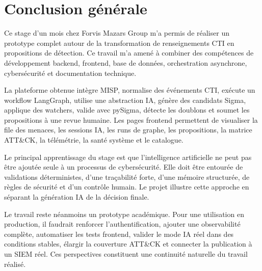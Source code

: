 \chapter*{Conclusion générale}

Ce stage d'un mois chez Forvis Mazars Group m'a permis de réaliser un prototype complet autour de la transformation de renseignements CTI en propositions de détection. Ce travail m'a amené à combiner des compétences de développement backend, frontend, base de données, orchestration asynchrone, cybersécurité et documentation technique.

La plateforme obtenue intègre MISP, normalise des événements CTI, exécute un workflow LangGraph, utilise une abstraction IA, génère des candidats Sigma, applique des watchers, valide avec pySigma, détecte les doublons et soumet les propositions à une revue humaine. Les pages frontend permettent de visualiser la file des menaces, les sessions IA, les runs de graphe, les propositions, la matrice ATT\&CK, la télémétrie, la santé système et le catalogue.

Le principal apprentissage du stage est que l'intelligence artificielle ne peut pas être ajoutée seule à un processus de cybersécurité. Elle doit être entourée de validations déterministes, d'une traçabilité forte, d'une mémoire structurée, de règles de sécurité et d'un contrôle humain. Le projet illustre cette approche en séparant la génération IA de la décision finale.

Le travail reste néanmoins un prototype académique. Pour une utilisation en production, il faudrait renforcer l'authentification, ajouter une observabilité complète, automatiser les tests frontend, valider le mode IA réel dans des conditions stables, élargir la couverture ATT\&CK et connecter la publication à un SIEM réel. Ces perspectives constituent une continuité naturelle du travail réalisé.
